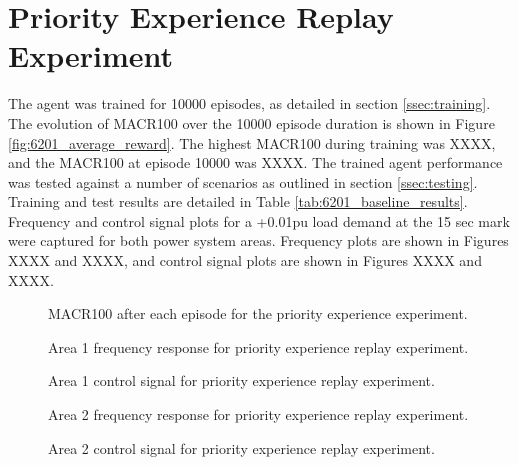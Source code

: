 \section{Priority Experience Replay Experiment}
The agent was trained for 10000 episodes, as detailed in section \ref{ssec:training}. The evolution of MACR100 over the 10000 episode duration is shown in Figure \ref{fig:6201_average_reward}. The highest MACR100 during training was XXXX, and the MACR100 at episode 10000 was XXXX. The trained agent performance was tested against a number of scenarios as outlined in section \ref{ssec:testing}. Training and test results are detailed in Table \ref{tab:6201_baseline_results}. Frequency and control signal plots for a +0.01pu load demand at the 15 sec mark were captured for both power system areas. Frequency plots are shown in Figures XXXX and XXXX, and control signal plots are shown in Figures XXXX and XXXX.

\vspace{2cm}

\begin{figure}[h]
	\centering
	
	\caption{MACR100 after each episode for the priority experience experiment.}
\end{figure}



\begin{figure}[h]
	\centering
	
	
	\vspace{-0.5cm}
	\caption{Area 1 frequency response for priority experience replay experiment.}
	
	\vspace{0.5cm}
	
	
	\vspace{-0.5cm}
	\caption{Area 1 control signal for priority experience replay experiment.}
	
	\vspace{0.5cm}
	
	
	\vspace{-0.5cm}
	\caption{Area 2 frequency response for priority experience replay experiment.}
	
	\vspace{0.5cm}
		
	
	\vspace{-0.5cm}
	\caption{Area 2 control signal for priority experience replay experiment.}
\end{figure}